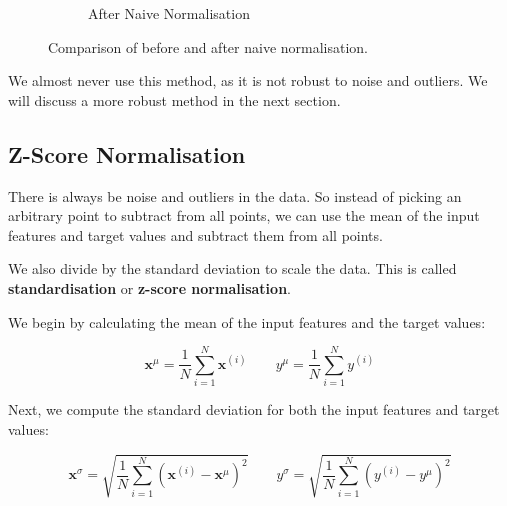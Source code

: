 \begin{figure}[h]
\begin{subfigure}{0.5\linewidth}
        \caption{After Naive Normalisation}
    \end{subfigure}
    \caption{Comparison of before and after naive normalisation.}
\end{figure}


We almost never use this method, as it is not robust to noise and outliers. We will discuss a more robust method in the next section.

\subsection{Z-Score Normalisation}
There is always be noise and outliers in the data. So instead of picking an arbitrary point to subtract from all points, we can use the mean of the input features and target values and subtract them from all points. \bigskip

We also divide by the standard deviation to scale the data. This is called \textbf{standardisation} or \textbf{z-score normalisation}. \bigskip


We begin by calculating the mean of the input features and the target values:

\begin{equation}
    \bm{x}^{\mu} = \frac{1}{N} \sum_{i=1}^{N} \bm{x}^{(i)} \quad\quad y^{\mu} = \frac{1}{N} \sum_{i=1}^{N} y^{(i)}
\end{equation}

Next, we compute the standard deviation for both the input features and target values:

\begin{equation}
    \bm{x}^{\sigma} = \sqrt{\frac{1}{N} \sum_{i=1}^{N} \left( \bm{x}^{(i)} - \bm{x}^{\mu} \right)^2}\quad\quad y^{\sigma} = \sqrt{\frac{1}{N} \sum_{i=1}^{N} \left( y^{(i)} - y^{\mu} \right)^2}
\end{equation}

